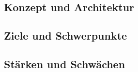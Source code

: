 




\subsection{Konzept und Architektur}
\label{sec:conceptArchitectureHAOS}
\subsection{Ziele und Schwerpunkte}
\subsection{Stärken und Schwächen}
